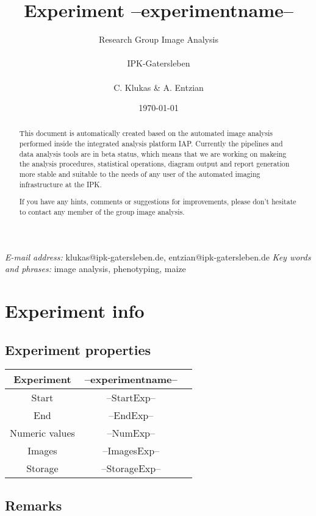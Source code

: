 \documentclass[%
  paper=a4, %
  pagesize, %
  DIV=calc, %
  headings=small,%
  english,   %
  oneside
]{scrartcl}  %
\providecommand{\tabularnewline}{\\}
\begin{document}
\title{Experiment --experimentname--}
\author{Research Group Image Analysis\tabularnewline \tabularnewline
IPK-Gatersleben\tabularnewline \tabularnewline C. Klukas \& A. Entzian}
\date{\today}

\maketitle
\thispagestyle{empty}  
\begin{abstract}
This document is automatically created based on the automated image analysis performed 
inside the integrated analysis platform IAP. Currently the pipelines and data analysis tools are in beta status, 
which means that we are working on makeing the analysis procedures, statistical operations, diagram output and report
generation more stable and suitable to the needs of any user of the automated imaging infrastructure at the IPK.

If you have any hints, comments or suggestions for improvements, please don't hesitate to contact any member
of the group image analysis.
\end{abstract}
\vfill
\small{\textit{E-mail address:} klukas@ipk-gatersleben.de, entzian@ipk-gatersleben.de}
\newline 
\small{\textit{Key words and phrases:} image analysis, phenotyping, maize }
 

\clearpage
\tableofcontents

\clearpage
\pagestyle{headings}
\section{Experiment info} 
\subsection{Experiment properties}


\begin{tabular}{|c|c|c|}
\hline 
Experiment & --experimentname--\tabularnewline
\hline 
\hline 
Start & --StartExp--\tabularnewline
\hline 
End & --EndExp--\tabularnewline
\hline 
Numeric values & --NumExp-- \tabularnewline
\hline 
Images & --ImagesExp-- \tabularnewline
\hline 
Storage & --StorageExp-- \tabularnewline
\hline 
\end{tabular}


\subsection{Remarks}
\end{document}
